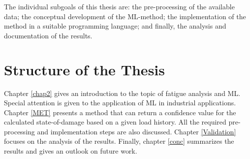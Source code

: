 The individual subgoals of this thesis are: the pre-processing of the available data; the conceptual development of the ML-method; the implementation of the method in a suitable programming language; and finally, the analysis and documentation of the results.

\section{Structure of the Thesis}
Chapter \ref{chap2} gives an introduction to the topic of fatigue analysis and ML. Special attention is given to the application of ML in industrial applications. Chapter \ref{MET} presents a method that can return a confidence value for the calculated state-of-damage based on a given load history. All the required pre-processing and implementation steps are also discussed. Chapter \ref{Validation} focuses on the analysis of the results. Finally, chapter \ref{conc} summarizes the results and gives an outlook on future work.

\afterpage{\null\newpage}
